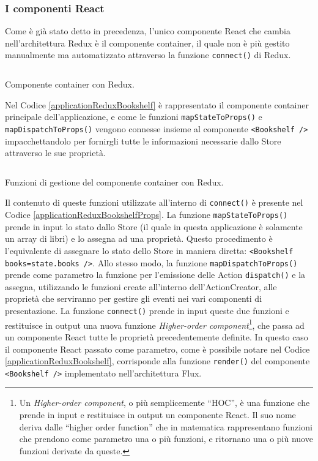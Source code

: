 \subsubsection*{I componenti React}
Come è già stato detto in precedenza, l'unico componente React che cambia nell'architettura Redux è il componente container, il quale non è più gestito manualmente ma automatizzato attraverso la funzione \texttt{connect()} di Redux.

\begin{listing}[ht]
\inputminted{javascript}{sources/applicationReduxBookshelf.js}
\caption{Componente container con Redux.} 
\label{applicationReduxBookshelf} 
\end{listing}

Nel Codice \ref{applicationReduxBookshelf} è rappresentato il componente container principale dell'applicazione, e come le funzioni \texttt{mapStateToProps()} e \texttt{mapDispatchToProps()} vengono connesse insieme al componente \texttt{<Bookshelf />} impacchettandolo per fornirgli tutte le informazioni necessarie dallo Store attraverso le sue proprietà.

\begin{listing}[ht]
\inputminted{javascript}{sources/applicationReduxBookshelfProps.js}
\caption{Funzioni di gestione del componente container con Redux.} 
\label{applicationReduxBookshelfProps} 
\end{listing} 

Il contenuto di queste funzioni utilizzate all'interno di \texttt{connect()} è presente nel Codice \ref{applicationReduxBookshelfProps}. La funzione \texttt{mapStateToProps()} prende in input lo stato dallo Store (il quale in questa applicazione è solamente un array di libri) e lo assegna ad una proprietà. Questo procedimento è l'equivalente di assegnare lo stato dello Store in maniera diretta: \texttt{<Bookshelf books={state.books} />}.
Allo stesso modo, la funzione \texttt{mapDispatchToProps()} prende come parametro la funzione per l'emissione delle Action \texttt{dispatch()} e la assegna, utilizzando le funzioni create all'interno dell'ActionCreator, alle proprietà che serviranno per gestire gli eventi nei vari componenti di presentazione.
La funzione \texttt{connect()} prende in input queste due funzioni e restituisce in output una nuova funzione \textit{Higher-order component}\footnote{Un \textit{Higher-order component}, o più semplicemente “HOC”, è una funzione che prende in input e restituisce in output un componente React. Il suo nome deriva dalle “higher order function” che in matematica rappresentano funzioni che prendono come parametro una o più funzioni, e ritornano una o più nuove funzioni derivate da queste.}, che passa ad un componente React tutte le proprietà precedentemente definite. In questo caso il componente React passato come parametro, come è possibile notare nel Codice \ref{applicationReduxBookshelf}, corrisponde alla funzione \texttt{render()} del componente \texttt{<Bookshelf />} implementato nell'architettura Flux.

